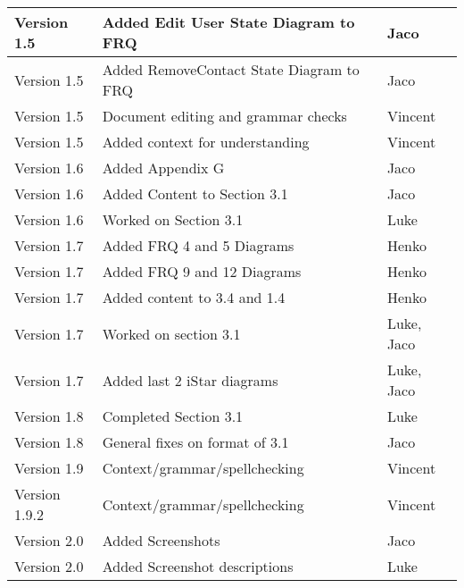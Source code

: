 \begin{center}
\begin{tabular}{|l|l|l|}
\hline
Version 1.5 & Added Edit User State Diagram to FRQ & Jaco\\
\hline
Version 1.5 & Added RemoveContact State Diagram to FRQ&Jaco\\
\hline
Version 1.5 & Document editing and grammar checks & Vincent\\
\hline
Version 1.5 & Added context for understanding & Vincent\\
\hline
Version 1.6 & Added Appendix G& Jaco\\
\hline
Version 1.6 & Added Content to Section 3.1&Jaco\\
\hline
Version 1.6 & Worked on Section 3.1&Luke\\
\hline
Version 1.7 & Added FRQ 4 and 5 Diagrams&Henko\\
\hline
Version 1.7 & Added FRQ 9 and 12 Diagrams&Henko\\
\hline
Version 1.7 & Added content to 3.4 and 1.4 &Henko\\
\hline
Version 1.7 & Worked on section 3.1&Luke, Jaco\\
\hline
Version 1.7 & Added last 2 iStar diagrams&Luke, Jaco\\
\hline
Version 1.8 & Completed Section 3.1&Luke\\
\hline
Version 1.8 & General fixes on format of 3.1&Jaco\\
\hline
Version 1.9 & Context/grammar/spellchecking&Vincent\\
\hline
Version 1.9.2 & Context/grammar/spellchecking&Vincent\\
\hline
Version 2.0 & Added Screenshots&Jaco\\
\hline
Version 2.0 & Added Screenshot descriptions&Luke\\
\hline
\end{tabular}
\end{center}
